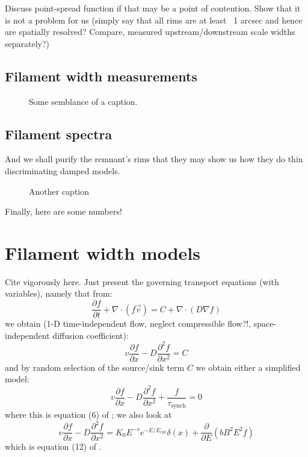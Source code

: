 \documentclass[manuscript]{aastex}  %
\newcommand{\mt}{\mathrm}
\newcommand{\ptl}{\partial}
\newcommand{\del}{\nabla}
\begin{document}
Discuss point-spread function if that may be a point of contention.
Show that it is not a problem for us (simply say that all rims are at
least ~1 arcsec and hence are spatially resolved? Compare,
\citet{bamba2005-hist} measured upstream/downstream scale widths separately?)

\subsection{Filament width measurements}
\begin{figure*}
    \caption{Some semblance of a caption.}
    \label{fig:profiles}
\end{figure*}

\subsection{Filament spectra}

And we shall purify the remnant's rims
that they may show us how they do thin
discriminating damped models.

\begin{figure}
    \caption{Another caption \citep{fermi1949}}
    \label{fig:spec}
\end{figure}

Finally, here are some numbers!


\section{Filament width models}

Cite \citet{ressler2014} vigorously here.  Just present the governing transport
equations (with variables), namely that from:
\[
  \frac{\ptl f}{\ptl t} + \del \cdot \left( f \vec{v} \right)
  = C + \del \cdot \left( D \del f \right)
\]
we obtain (1-D time-independent flow, neglect compressible flow?!,
space-independent diffusion coefficient):
\[
    v \frac{\ptl f}{\ptl x} - D \frac{\ptl^2 f}{\ptl x^2} = C
\]
and by random selection of the source/sink term $C$ we obtain either a
simplified model:
\begin{equation}
    v \frac{\ptl f}{\ptl x} - D \frac{\ptl^2 f}{\ptl x^2} +
    \frac{f}{\tau_{\mt{synch}}} = 0
\end{equation}
where this is equation (6) of \citet{ressler2014}; we also look at
\begin{equation}
    v \frac{\ptl f}{\ptl x} - D \frac{\ptl^2 f}{\ptl x^2} =
    K_0 E^{-s} e^{-E/E_{\mt{cut}}} \delta(x) + \frac{\ptl}{\ptl E}
      \left(bB^2E^2f\right)
\end{equation}
which is equation (12) of \citet{ressler2014}.
\end{document}
